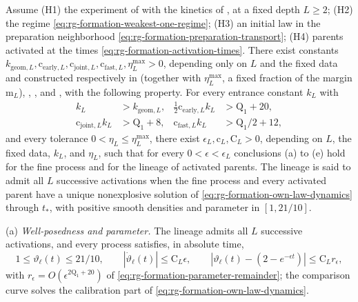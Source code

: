 Assume
(H1) the experiment of 
with the kinetics of ,
at a fixed depth \(L\ge2\);
(H2) the regime \cref{eq:rg-formation-weakest-one-regime};
(H3) an initial law in the preparation neighborhood
\cref{eq:rg-formation-preparation-transport};
(H4) parents activated at the times \cref{eq:rg-formation-activation-times}.
There exist constants \(k_{\mathrm{geom},L},\mathrm c_{\mathrm{early},L},
\mathrm c_{\mathrm{joint},L},\mathrm c_{\mathrm{fast},L},\eta_L^{\max}>0\),
depending only on \(L\) and the fixed data and constructed respectively in
 (together with \(\eta_L^{\max}\), a fixed
fraction of the margin \(\mathrm m_L\)),
,
, and
, with the following property. For every
entrance constant \(k_L\) with
\begin{equation}
\begin{aligned}
k_L&>k_{\mathrm{geom},L},&
\tfrac12\mathrm c_{\mathrm{early},L}k_L&>\mathrm Q_1+20,\\
\mathrm c_{\mathrm{joint},L}k_L&>\mathrm Q_1+8,&
\mathrm c_{\mathrm{fast},L}k_L&>\mathrm Q_1/2+12,
\end{aligned}
\label{eq:rg-formation-common-entrance}
\end{equation}
and every tolerance \(0<\eta_L\le\eta_L^{\max}\), there exist
\(\epsilon_L,\mathrm c_L,\mathrm C_L>0\), depending on \(L\), the fixed data,
\(k_L\), and \(\eta_L\), such that for every \(0<\epsilon<\epsilon_L\)
conclusions (a) to (e) hold for the fine process and for the lineage of
activated parents. The lineage is said to admit all \(L\) successive
activations when the fine process and every activated parent have a unique
nonexplosive solution of \cref{eq:rg-formation-own-law-dynamics} through
\(t_*\), with positive smooth densities and parameter in \([1,21/10]\).

(a) \emph{Well-posedness and parameter.} The lineage admits all \(L\)
successive activations, and every process satisfies, in absolute time,
\begin{equation}
1\le\vartheta_\ell(t)\le21/10,\qquad
|\dot\vartheta_\ell(t)|\le\mathrm C_L\epsilon,\qquad
|\vartheta_\ell(t)-(2-e^{-\epsilon t})|\le\mathrm C_Lr_\epsilon,
\label{eq:rg-formation-parameter-bound}
\end{equation}
with \(r_\epsilon=O(\epsilon^{2\mathrm Q_1+20})\) of
\cref{eq:rg-formation-parameter-remainder}; the comparison curve solves the
calibration part of \cref{eq:rg-formation-own-law-dynamics}.

